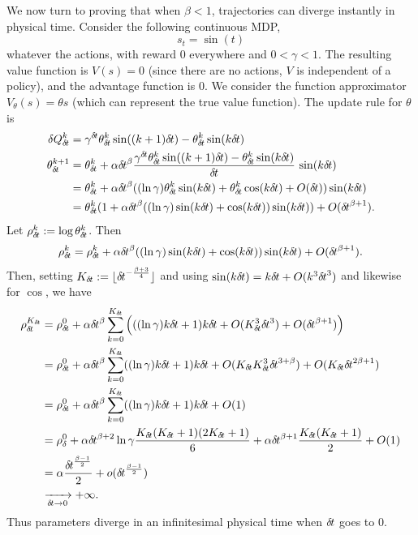 We now turn to proving that when $\beta < 1$,
trajectories can diverge instantly in physical time. 
Consider the following continuous MDP, 
\begin{equation}
	s_t = \sin(t)
\end{equation}
whatever the actions,
with reward $0$ everywhere and $0 < \gamma < 1$.
The resulting value function is $V(s) = 0$ (since there
are no actions, $V$ is independent of a policy), and the advantage
function is $0$.
We consider the function approximator $V_\theta(s) = \theta s$ (which can
represent the true value function).
The update rule for $\theta$ is
\begin{align}
\delta Q_\deltat^k &= \gamma^\deltat \theta_\deltat^k \sin((k + 1)
\deltat) - \theta_\deltat^k \sin(k\deltat)\\
	\theta_\deltat^{k+1} &= \theta_\deltat^k + \alpha \deltat^\beta
	\frac{\gamma^\deltat \theta_\deltat^k \sin((k + 1) \deltat) -
	\theta_\deltat^k \sin(k\deltat)}{\deltat}\,\sin(k\deltat)\\
			     &= \theta_\deltat^k + \alpha \deltat^\beta
			     ((\ln \gamma) \theta_\deltat^k \sin(k \deltat)
			     + \theta_\deltat^k \cos(k
			     \deltat)+\bigO(\deltat))\sin(k\deltat)\\
			     &= \theta_\deltat^k(1 + \alpha \deltat^\beta
			     ((\ln \gamma) \sin(k \deltat) + \cos(k
			     \deltat))\sin(k\deltat)) + \bigO(\deltat^{\beta + 1}).
\end{align}
Let $\rho_{\delta\hspace{-.1em}t}^k \mathrel{\mathop{:}}= \log \theta_{\delta\hspace{-.1em}t}^k$. Then
\begin{align}
	\rho_{\delta\hspace{-.1em}t}^k = \rho_{\delta\hspace{-.1em}t}^k + \alpha {\delta\hspace{-.1em}t}^\beta ((\ln
	\gamma) \sin(k {\delta\hspace{-.1em}t}) + \cos(k {\delta\hspace{-.1em}t}))\sin(k{\delta\hspace{-.1em}t}) +
	O({\delta\hspace{-.1em}t}^{\beta+1}).
\end{align}
Then, setting $K_{\delta\hspace{-.1em}t} \mathrel{\mathop{:}}= \lfloor {\delta\hspace{-.1em}t}^{-\frac{\beta +
3}{4}}\rfloor$ and using $\sin(k{\delta\hspace{-.1em}t})=k{\delta\hspace{-.1em}t}+O(k^3{\delta\hspace{-.1em}t}^3)$ and
likewise for $\cos$, we have
\begin{align}
	\rho_\deltat^{K_\deltat} &= \rho_\deltat^0 + \alpha \deltat^\beta
	\sum\limits_{k=0}^{K_\deltat} \left(((\ln \gamma)k\deltat +
	1)k\deltat + \bigO(K_\deltat^3 \deltat^{3}) +
	\bigO(\deltat^{\beta+1})\right)\\
	&= \rho_\deltat^0 + \alpha \deltat^\beta
	\sum\limits_{k=0}^{K_\deltat} ((\ln \gamma) k\deltat +
	1)k\deltat + \bigO(K_\deltat K_\deltat^3 \deltat^{3 + \beta}) +
	\bigO(K_\deltat \deltat^{2\beta+1})\\
				 &= \rho_\deltat^0 + \alpha \deltat^\beta
				 \sum\limits_{k=0}^{K_\deltat} ((\ln
				 \gamma) k\deltat + 1)k\deltat +
				 \bigO(1)\\
				 &= \rho_\delta^0 + \alpha\deltat^{\beta
				 + 2} \ln\gamma \frac{K_\deltat
				 (K_\deltat + 1) (2 K_\deltat + 1)}{6} +
				 \alpha \deltat^{\beta + 1}
				 \frac{K_\deltat (K_\deltat + 1)}{2} +
				 O(1)\\
				 &= \alpha \frac{\deltat^{\frac{\beta - 1}{2}}}{2} + \smallo(\deltat^{\frac{\beta - 1}{2}})\\
				 &\xrightarrow[\deltat\to 0]{} +\infty.
\end{align}
Thus parameters diverge in an infinitesimal physical time when ${\delta\hspace{-.1em}t}$ goes to $0$.

